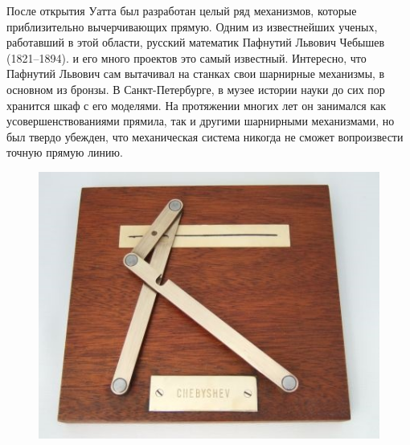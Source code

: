 После открытия Уатта был разработан целый ряд механизмов, которые приблизительно вычерчивающих прямую. Одним из известнейших ученых, работавший в этой области, русский математик Пафнутий Львович Чебышев (1821--1894). и его много проектов это самый известный. Интересно, что Пафнутий Львович сам вытачивал на станках свои шарнирные механизмы, в основном из бронзы. В Санкт-Петербурге, в музее истории науки до сих пор хранится шкаф с его моделями. На протяжении многих лет он занимался как усовершенствованиями прямила, так и другими шарнирными механизмами, но был твердо убежден, что механическая система никогда не сможет вопроизвести точную прямую линию.
\clearpage
\begin{figure}[h!]
	\begin{center}
		\includegraphics[width=1\linewidth]{chapters/chapter22/images/3}
		\caption{}
		\label{ris:image22x3}
	\end{center}
\end{figure}

